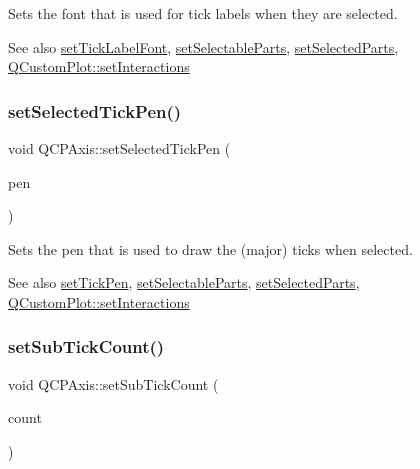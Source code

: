 Sets the font that is used for tick labels when they are selected.

\begin{DoxySeeAlso}{See also}
\mbox{\hyperlink{class_q_c_p_axis_a2b8690c4e8dbc39d9185d2b398ce7a6c}{set\+Tick\+Label\+Font}}, \mbox{\hyperlink{class_q_c_p_axis_a513f9b9e326c505d9bec54880031b085}{set\+Selectable\+Parts}}, \mbox{\hyperlink{class_q_c_p_axis_ab9d7a69277dcbed9119b3c1f25ca19c3}{set\+Selected\+Parts}}, \mbox{\hyperlink{class_q_custom_plot_a5ee1e2f6ae27419deca53e75907c27e5}{Q\+Custom\+Plot\+::set\+Interactions}} 
\end{DoxySeeAlso}
\mbox{\label{class_q_c_p_axis_a8360502685eb782edbf04019c9345cdc}} 
\subsubsection{\texorpdfstring{set\+Selected\+Tick\+Pen()}{setSelectedTickPen()}}
{\footnotesize\ttfamily void Q\+C\+P\+Axis\+::set\+Selected\+Tick\+Pen (\begin{DoxyParamCaption}\item[{const Q\+Pen \&}]{pen }\end{DoxyParamCaption})}

Sets the pen that is used to draw the (major) ticks when selected.

\begin{DoxySeeAlso}{See also}
\mbox{\hyperlink{class_q_c_p_axis_ad80923bcc1c5da4c4db602c5325e797e}{set\+Tick\+Pen}}, \mbox{\hyperlink{class_q_c_p_axis_a513f9b9e326c505d9bec54880031b085}{set\+Selectable\+Parts}}, \mbox{\hyperlink{class_q_c_p_axis_ab9d7a69277dcbed9119b3c1f25ca19c3}{set\+Selected\+Parts}}, \mbox{\hyperlink{class_q_custom_plot_a5ee1e2f6ae27419deca53e75907c27e5}{Q\+Custom\+Plot\+::set\+Interactions}} 
\end{DoxySeeAlso}
\mbox{\label{class_q_c_p_axis_a4b1554ead9d7f9799650d51383e326dd}} 
\subsubsection{\texorpdfstring{set\+Sub\+Tick\+Count()}{setSubTickCount()}}
{\footnotesize\ttfamily void Q\+C\+P\+Axis\+::set\+Sub\+Tick\+Count (\begin{DoxyParamCaption}\item[{int}]{count }\end{DoxyParamCaption})}

